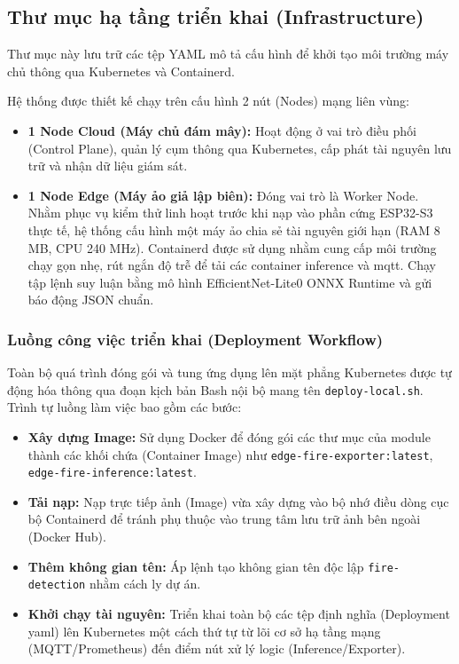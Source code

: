 \documentclass[12pt,a4paper]{report}
\begin{document}
\subsection{Thư mục hạ tầng triển khai (Infrastructure)}

Thư mục này lưu trữ các tệp YAML mô tả cấu hình để khởi tạo môi trường máy chủ thông qua Kubernetes và Containerd.

Hệ thống được thiết kế chạy trên cấu hình 2 nút (Nodes) mạng liên vùng:
\begin{itemize}
  \item \textbf{1 Node Cloud (Máy chủ đám mây):} Hoạt động ở vai trò điều phối (Control Plane), quản lý cụm thông qua Kubernetes, cấp phát tài nguyên lưu trữ và nhận dữ liệu giám sát.
  \item \textbf{1 Node Edge (Máy ảo giả lập biên):} Đóng vai trò là Worker Node. Nhằm phục vụ kiểm thử linh hoạt trước khi nạp vào phần cứng ESP32-S3 thực tế, hệ thống cấu hình một máy ảo chia sẻ tài nguyên giới hạn (RAM 8 MB, CPU 240 MHz). Containerd được sử dụng nhằm cung cấp môi trường chạy gọn nhẹ, rút ngắn độ trễ để tải các container inference và mqtt. Chạy tập lệnh suy luận bằng mô hình EfficientNet-Lite0 ONNX Runtime và gửi báo động JSON chuẩn.
\end{itemize}

\subsubsection{Luồng công việc triển khai (Deployment Workflow)}

Toàn bộ quá trình đóng gói và tung ứng dụng lên mặt phẳng Kubernetes được tự động hóa thông qua đoạn kịch bản Bash nội bộ mang tên \texttt{deploy-local.sh}. Trình tự luồng làm việc bao gồm các bước:
\begin{itemize}
  \item \textbf{Xây dựng Image:} Sử dụng Docker để đóng gói các thư mục của module thành các khối chứa (Container Image) như \texttt{edge-fire-exporter:latest}, \texttt{edge-fire-inference:latest}.
  \item \textbf{Tải nạp:} Nạp trực tiếp ảnh (Image) vừa xây dựng vào bộ nhớ điều dòng cục bộ Containerd để tránh phụ thuộc vào trung tâm lưu trữ ảnh bên ngoài (Docker Hub).
  \item \textbf{Thêm không gian tên:} Áp lệnh tạo không gian tên độc lập \texttt{fire-detection} nhằm cách ly dự án.
  \item \textbf{Khởi chạy tài nguyên:} Triển khai toàn bộ các tệp định nghĩa (Deployment yaml) lên Kubernetes một cách thứ tự từ lõi cơ sở hạ tầng mạng (MQTT/Prometheus) đến điểm nút xử lý logic (Inference/Exporter).
\end{itemize}
\end{document}
